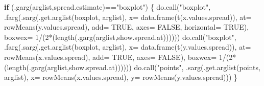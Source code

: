 \documentclass[
  letterpaper,
  DIV=11,
  numbers=noendperiod]{scrartcl}
\newenvironment{Shaded}{\begin{snugshade}}{\end{snugshade}}
\newcommand{\AttributeTok}[1]{\textcolor[rgb]{0.40,0.45,0.13}{#1}}
\newcommand{\ConstantTok}[1]{\textcolor[rgb]{0.56,0.35,0.01}{#1}}
\newcommand{\ControlFlowTok}[1]{\textcolor[rgb]{0.00,0.23,0.31}{\textbf{#1}}}
\newcommand{\DecValTok}[1]{\textcolor[rgb]{0.68,0.00,0.00}{#1}}
\newcommand{\FunctionTok}[1]{\textcolor[rgb]{0.28,0.35,0.67}{#1}}
\newcommand{\NormalTok}[1]{\textcolor[rgb]{0.00,0.23,0.31}{#1}}
\newcommand{\SpecialCharTok}[1]{\textcolor[rgb]{0.37,0.37,0.37}{#1}}
\newcommand{\StringTok}[1]{\textcolor[rgb]{0.13,0.47,0.30}{#1}}
\begin{document}
\begin{Shaded}
\begin{Highlighting}[]
    \ControlFlowTok{if}\NormalTok{ (}\FunctionTok{.garg}\NormalTok{(arglist,}\StringTok{\textquotesingle{}spread.estimate\textquotesingle{}}\NormalTok{)}\SpecialCharTok{==}\StringTok{"boxplot"}\NormalTok{) \{}
        \FunctionTok{do.call}\NormalTok{(}\StringTok{"boxplot"}\NormalTok{,}
                \FunctionTok{.farg}\NormalTok{(}\FunctionTok{.sarg}\NormalTok{(}\FunctionTok{.get.arglist}\NormalTok{(}\StringTok{\textquotesingle{}boxplot\textquotesingle{}}\NormalTok{, arglist),}
                            \AttributeTok{x=} \FunctionTok{data.frame}\NormalTok{(}\FunctionTok{t}\NormalTok{(x.values.spread)),}
                            \AttributeTok{at=} \FunctionTok{rowMeans}\NormalTok{(y.values.spread),}
                            \AttributeTok{add=} \ConstantTok{TRUE}\NormalTok{,}
                            \AttributeTok{axes=} \ConstantTok{FALSE}\NormalTok{,}
                            \AttributeTok{horizontal=} \ConstantTok{TRUE}\NormalTok{),}
                      \AttributeTok{boxwex=} \DecValTok{1}\SpecialCharTok{/}\NormalTok{(}\DecValTok{2}\SpecialCharTok{*}\NormalTok{(}\FunctionTok{length}\NormalTok{(}\FunctionTok{.garg}\NormalTok{(arglist,}\StringTok{\textquotesingle{}show.spread.at\textquotesingle{}}\NormalTok{))))))}
        \FunctionTok{do.call}\NormalTok{(}\StringTok{"boxplot"}\NormalTok{,}
                \FunctionTok{.farg}\NormalTok{(}\FunctionTok{.sarg}\NormalTok{(}\FunctionTok{.get.arglist}\NormalTok{(}\StringTok{\textquotesingle{}boxplot\textquotesingle{}}\NormalTok{, arglist),}
                            \AttributeTok{x=} \FunctionTok{data.frame}\NormalTok{(}\FunctionTok{t}\NormalTok{(y.values.spread)),}
                            \AttributeTok{at=} \FunctionTok{rowMeans}\NormalTok{(x.values.spread),}
                            \AttributeTok{add=} \ConstantTok{TRUE}\NormalTok{,}
                            \AttributeTok{axes=} \ConstantTok{FALSE}\NormalTok{),}
                      \AttributeTok{boxwex=} \DecValTok{1}\SpecialCharTok{/}\NormalTok{(}\DecValTok{2}\SpecialCharTok{*}\NormalTok{(}\FunctionTok{length}\NormalTok{(}\FunctionTok{.garg}\NormalTok{(arglist,}\StringTok{\textquotesingle{}show.spread.at\textquotesingle{}}\NormalTok{))))))}
        \FunctionTok{do.call}\NormalTok{(}\StringTok{"points"}\NormalTok{, }\FunctionTok{.sarg}\NormalTok{(}\FunctionTok{.get.arglist}\NormalTok{(}\StringTok{\textquotesingle{}points\textquotesingle{}}\NormalTok{, arglist),}
                                \AttributeTok{x=} \FunctionTok{rowMeans}\NormalTok{(x.values.spread),}
                                \AttributeTok{y=} \FunctionTok{rowMeans}\NormalTok{(y.values.spread)))}
\NormalTok{    \}}
    

\end{Highlighting}
\end{Shaded}
\end{document}
